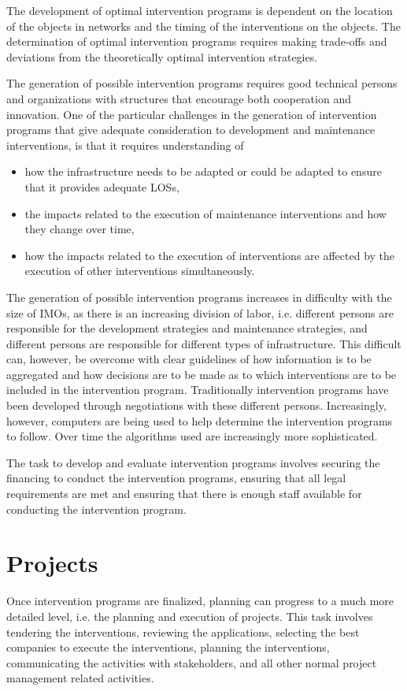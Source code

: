 The development of optimal intervention programs is dependent on the location of the objects in networks and the timing of the interventions on the objects. The determination of optimal intervention programs requires making trade-offs and deviations from the theoretically optimal intervention strategies. 

The generation of possible intervention programs requires good technical persons and organizations with structures that encourage both cooperation and innovation. One of the particular challenges in the generation of intervention programs that give adequate consideration to development and maintenance interventions, is that it requires understanding of

\begin{itemize}
\item how the infrastructure needs to be adapted or could be adapted to ensure that it provides adequate LOSs,
\item the impacts related to the execution of maintenance interventions and how they change over time,
\item how the impacts related to the execution of interventions are affected by the execution of other interventions simultaneously.
\end{itemize}

The generation of possible intervention programs increases in difficulty with the size of IMOs, as there is an increasing division of labor, i.e. different persons are responsible for the development strategies and maintenance strategies, and different persons are responsible for different types of infrastructure. This difficult can, however, be overcome with clear guidelines of how information is to be aggregated and how decisions are to be made as to which interventions are to be included in the intervention program.
Traditionally intervention programs have been developed through negotiations with these different persons. Increasingly, however, computers are being used to help determine the intervention programs to follow. Over time the algorithms used are increasingly more sophisticated.

The task to develop and evaluate intervention programs involves securing the financing to conduct the intervention programs, ensuring that all legal requirements are met and ensuring that there is enough staff available for conducting the intervention program.

\section{Projects}
Once intervention programs are finalized, planning can progress to a much more detailed level, i.e. the planning and execution of projects. This task involves tendering the interventions, reviewing the applications, selecting the best companies to execute the interventions, planning the interventions, communicating the activities with stakeholders, and all other normal project management related activities.

